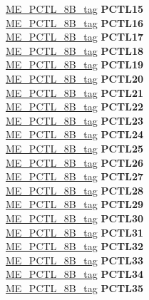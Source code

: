 \begin{DoxyCompactItemize}
\begin{tabbing}
\>\>\mbox{\hyperlink{unionME__PCTL__8B__tag}{ME\_PCTL\_8B\_tag}} {\bfseries PCTL15}\\
\>\>\mbox{\hyperlink{unionME__PCTL__8B__tag}{ME\_PCTL\_8B\_tag}} {\bfseries PCTL16}\\
\>\>\mbox{\hyperlink{unionME__PCTL__8B__tag}{ME\_PCTL\_8B\_tag}} {\bfseries PCTL17}\\
\>\>\mbox{\hyperlink{unionME__PCTL__8B__tag}{ME\_PCTL\_8B\_tag}} {\bfseries PCTL18}\\
\>\>\mbox{\hyperlink{unionME__PCTL__8B__tag}{ME\_PCTL\_8B\_tag}} {\bfseries PCTL19}\\
\>\>\mbox{\hyperlink{unionME__PCTL__8B__tag}{ME\_PCTL\_8B\_tag}} {\bfseries PCTL20}\\
\>\>\mbox{\hyperlink{unionME__PCTL__8B__tag}{ME\_PCTL\_8B\_tag}} {\bfseries PCTL21}\\
\>\>\mbox{\hyperlink{unionME__PCTL__8B__tag}{ME\_PCTL\_8B\_tag}} {\bfseries PCTL22}\\
\>\>\mbox{\hyperlink{unionME__PCTL__8B__tag}{ME\_PCTL\_8B\_tag}} {\bfseries PCTL23}\\
\>\>\mbox{\hyperlink{unionME__PCTL__8B__tag}{ME\_PCTL\_8B\_tag}} {\bfseries PCTL24}\\
\>\>\mbox{\hyperlink{unionME__PCTL__8B__tag}{ME\_PCTL\_8B\_tag}} {\bfseries PCTL25}\\
\>\>\mbox{\hyperlink{unionME__PCTL__8B__tag}{ME\_PCTL\_8B\_tag}} {\bfseries PCTL26}\\
\>\>\mbox{\hyperlink{unionME__PCTL__8B__tag}{ME\_PCTL\_8B\_tag}} {\bfseries PCTL27}\\
\>\>\mbox{\hyperlink{unionME__PCTL__8B__tag}{ME\_PCTL\_8B\_tag}} {\bfseries PCTL28}\\
\>\>\mbox{\hyperlink{unionME__PCTL__8B__tag}{ME\_PCTL\_8B\_tag}} {\bfseries PCTL29}\\
\>\>\mbox{\hyperlink{unionME__PCTL__8B__tag}{ME\_PCTL\_8B\_tag}} {\bfseries PCTL30}\\
\>\>\mbox{\hyperlink{unionME__PCTL__8B__tag}{ME\_PCTL\_8B\_tag}} {\bfseries PCTL31}\\
\>\>\mbox{\hyperlink{unionME__PCTL__8B__tag}{ME\_PCTL\_8B\_tag}} {\bfseries PCTL32}\\
\>\>\mbox{\hyperlink{unionME__PCTL__8B__tag}{ME\_PCTL\_8B\_tag}} {\bfseries PCTL33}\\
\>\>\mbox{\hyperlink{unionME__PCTL__8B__tag}{ME\_PCTL\_8B\_tag}} {\bfseries PCTL34}\\
\>\>\mbox{\hyperlink{unionME__PCTL__8B__tag}{ME\_PCTL\_8B\_tag}} {\bfseries PCTL35}\\

\end{tabbing}
\end{DoxyCompactItemize}
